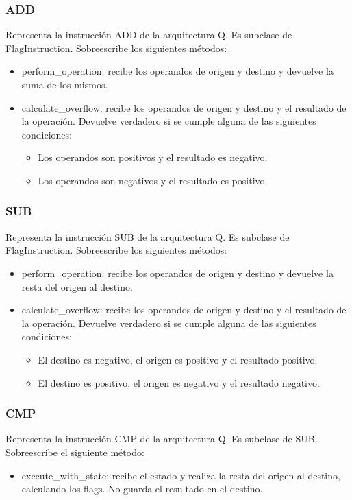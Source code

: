 \subsubsection{ADD}
Representa la instrucción ADD de la arquitectura Q. Es subclase de FlagInstruction. Sobreescribe los siguientes métodos:
\begin{itemize}
\item perform\_operation: recibe los operandos de origen y destino y devuelve la suma de los mismos.
\item calculate\_overflow: recibe los operandos de origen y destino y el resultado de la operación. Devuelve verdadero si se cumple alguna de las siguientes condiciones: 
	\begin{itemize}
	\item Los operandos son positivos y el resultado es negativo.
	\item Los operandos son negativos y el resultado es positivo.
	\end{itemize}
\end{itemize}

\subsubsection{SUB}
Representa la instrucción SUB de la arquitectura Q. Es subclase de FlagInstruction. Sobreescribe los siguientes métodos:
\begin{itemize}
\item perform\_operation: recibe los operandos de origen y destino y devuelve la resta del origen al destino.
\item calculate\_overflow: recibe los operandos de origen y destino y el resultado de la operación. Devuelve verdadero si se cumple alguna de las siguientes condiciones: 
	\begin{itemize}
	\item El destino es negativo, el origen es positivo y el resultado positivo.
	\item El destino es positivo, el origen es negativo y el resultado negativo.
	\end{itemize}
\end{itemize}

\subsubsection{CMP}
Representa la instrucción CMP de la arquitectura Q. Es subclase de SUB. Sobreescribe el siguiente método:
\begin{itemize}
\item execute\_with\_state: recibe el estado y realiza la resta del origen al destino, calculando los flags. No guarda el resultado en el destino.
\end{itemize}

